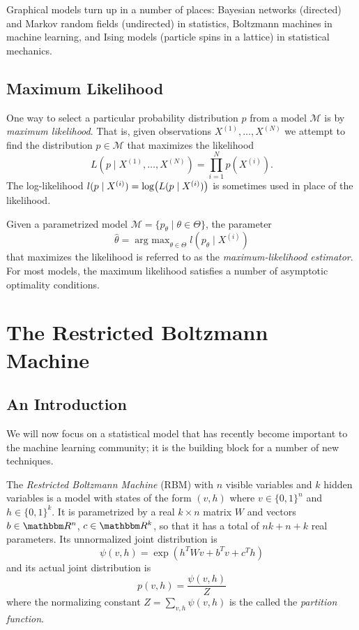 \documentclass[11pt,titlepage]{article}
\newcommand*{\Mod}{\mathcal{M}}
\DeclareMathOperator*{\argmax}{arg\ max}
\begin{document}
    Graphical models turn up in a number of places: Bayesian networks (directed)
    and Markov random fields (undirected) in statistics, Boltzmann machines in
    machine learning, and Ising models (particle spins in a lattice) in
    statistical mechanics.

\subsection{Maximum Likelihood}

    One way to select a particular probability distribution $p$ from a model
    $\Mod$ is by \emph{maximum likelihood}.  That is, given observations
    $X^{(1)}, \ldots, X^{(N)}$ we attempt to find the distribution $p \in \Mod$
    that maximizes the likelihood
    \[
        L(p \mid X^{(1)}, \ldots, X^{(N)}) = \prod_{i=1}^N p(X^{(i)}).
    \]
    The log-likelihood $l(p \mid X^{(i)}) = \log\pdil[\big]{L(p \mid X^{(i)})}$
    is sometimes used in place of the likelihood.

    Given a parametrized model $\Mod = \{p_\theta \mid \theta \in \Theta\}$, the
    parameter 
    \[
        \hat\theta = \argmax_{\theta \in \Theta} l(p_\theta \mid X^{(i)})
    \]
    that maximizes the likelihood is referred to as the \emph{maximum-likelihood
    estimator}.  For most models, the maximum likelihood satisfies a number of
    asymptotic optimality conditions.


\section{The Restricted Boltzmann Machine}

\subsection{An Introduction}
    We will now focus on a statistical model that has recently become important
    to the machine learning community; it is the building block for a number of
    new techniques.
    \begin{definition}
    The \emph{Restricted Boltzmann Machine} (RBM) with $n$ visible variables and
    $k$ hidden variables is a model with states of the form $(v, h)$ where $v
    \in \{0,1\}^n$ and $h \in \{0,1\}^k$.  It is parametrized by a real $k
    \times n$ matrix $W$ and vectors $b \in \R^n$, $c \in \R^k$, so that it has
    a total of $nk + n + k$ real parameters.  Its unnormalized joint
    distribution is
    \[
        \psi(v, h) = \exp(h^T W v + b^Tv + c^T h)
    \]
    and its actual joint distribution is 
    \[
        p(v, h) = \frac{\psi(v,h)}{Z}
    \] 
    where the normalizing constant $Z = \sum_{v,h} \psi(v, h)$ is the called the
    \emph{partition function}.  
    \end{definition}
\end{document}

